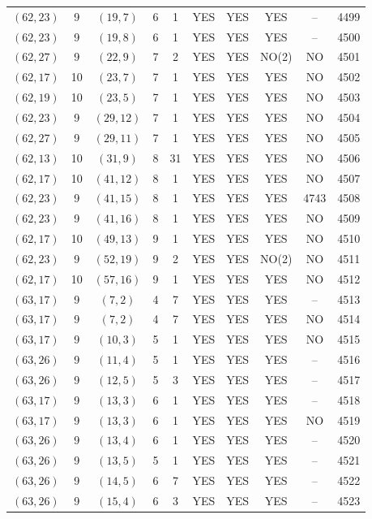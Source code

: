 \begin{longtable}{|c|c|c|c|c|c|c|c|c|c|}
$(62, 23)$ & 9 & $(19, 7)$ & 6 & 1 & YES & YES & YES & -- & 4499\\
$(62, 23)$ & 9 & $(19, 8)$ & 6 & 1 & YES & YES & YES & -- & 4500\\
$(62, 27)$ & 9 & $(22, 9)$ & 7 & 2 & YES & YES & NO(2) & NO & 4501\\
$(62, 17)$ & 10 & $(23, 7)$ & 7 & 1 & YES & YES & YES & NO & 4502\\
$(62, 19)$ & 10 & $(23, 5)$ & 7 & 1 & YES & YES & YES & NO & 4503\\
$(62, 23)$ & 9 & $(29, 12)$ & 7 & 1 & YES & YES & YES & NO & 4504\\
$(62, 27)$ & 9 & $(29, 11)$ & 7 & 1 & YES & YES & YES & NO & 4505\\
$(62, 13)$ & 10 & $(31, 9)$ & 8 & 31 & YES & YES & YES & NO & 4506\\
$(62, 17)$ & 10 & $(41, 12)$ & 8 & 1 & YES & YES & YES & NO & 4507\\
$(62, 23)$ & 9 & $(41, 15)$ & 8 & 1 & YES & YES & YES & 4743 & 4508\\
$(62, 23)$ & 9 & $(41, 16)$ & 8 & 1 & YES & YES & YES & NO & 4509\\
$(62, 17)$ & 10 & $(49, 13)$ & 9 & 1 & YES & YES & YES & NO & 4510\\
$(62, 23)$ & 9 & $(52, 19)$ & 9 & 2 & YES & YES & NO(2) & NO & 4511\\
$(62, 17)$ & 10 & $(57, 16)$ & 9 & 1 & YES & YES & YES & NO & 4512\\
$(63, 17)$ & 9 & $(7, 2)$ & 4 & 7 & YES & YES & YES & -- & 4513\\
$(63, 17)$ & 9 & $(7, 2)$ & 4 & 7 & YES & YES & YES & NO & 4514\\
$(63, 17)$ & 9 & $(10, 3)$ & 5 & 1 & YES & YES & YES & NO & 4515\\
$(63, 26)$ & 9 & $(11, 4)$ & 5 & 1 & YES & YES & YES & -- & 4516\\
$(63, 26)$ & 9 & $(12, 5)$ & 5 & 3 & YES & YES & YES & -- & 4517\\
$(63, 17)$ & 9 & $(13, 3)$ & 6 & 1 & YES & YES & YES & -- & 4518\\
$(63, 17)$ & 9 & $(13, 3)$ & 6 & 1 & YES & YES & YES & NO & 4519\\
$(63, 26)$ & 9 & $(13, 4)$ & 6 & 1 & YES & YES & YES & -- & 4520\\
$(63, 26)$ & 9 & $(13, 5)$ & 5 & 1 & YES & YES & YES & -- & 4521\\
$(63, 26)$ & 9 & $(14, 5)$ & 6 & 7 & YES & YES & YES & -- & 4522\\
$(63, 26)$ & 9 & $(15, 4)$ & 6 & 3 & YES & YES & YES & -- & 4523\\

\end{longtable}
